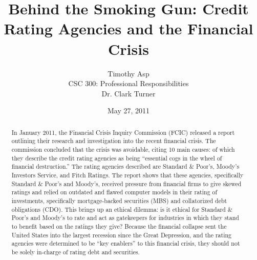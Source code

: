 \documentclass[11pt]{article}
\begin{document}
\title{\vfill Behind the Smoking Gun: Credit Rating Agencies and the Financial Crisis} %
\author{
Timothy Asp\vspace{10pt} \\
CSC 300: Professional Responsibilities\vspace{10pt} \\
Dr. Clark Turner\vspace{10pt} \\
}

\date{May 27, 2011}

\maketitle

\vfill
\begin{abstract}
In January 2011, the Financial Crisis Inquiry Commission (FCIC) released a report outlining their research and investigation into the recent financial crisis.  The commission concluded that the crisis was avoidable, citing 10 main causes: of which they describe the credit rating agencies as being ``essential cogs in the wheel of financial destruction.''\cite[p.~417-418]{govtReport}\cite[p.~xxv]{govtReport}  The rating agencies described are Standard \& Poor's, Moody's Investors Service, and Fitch Ratings.  The report shows that these agencies, specifically Standard \& Poor's and Moody's, received pressure from financial firms to give skewed ratings \cite{ratingEthics, hRatingEthics} and relied on outdated and flawed computer models in their rating of investments, specifically mortgage-backed securities (MBS) and collatorized debt obligations (CDO). \cite[p.~xxv]{govtReport}  This brings up an ethical dilemma: is it ethical for Standard \& Poor's and Moody's to rate and act as gatekeepers for industries in which they stand to benefit based on the ratings they give?  Because the financial collapse sent the United States into the largest recession since the Great Depression, and the rating agencies were determined to be ``key enablers'' to this financial crisis, they should not be solely in-charge of rating debt and securities. 
\end{abstract}

\thispagestyle{empty} %
\newpage


\thispagestyle{empty}  %
\tableofcontents
\end{document}
